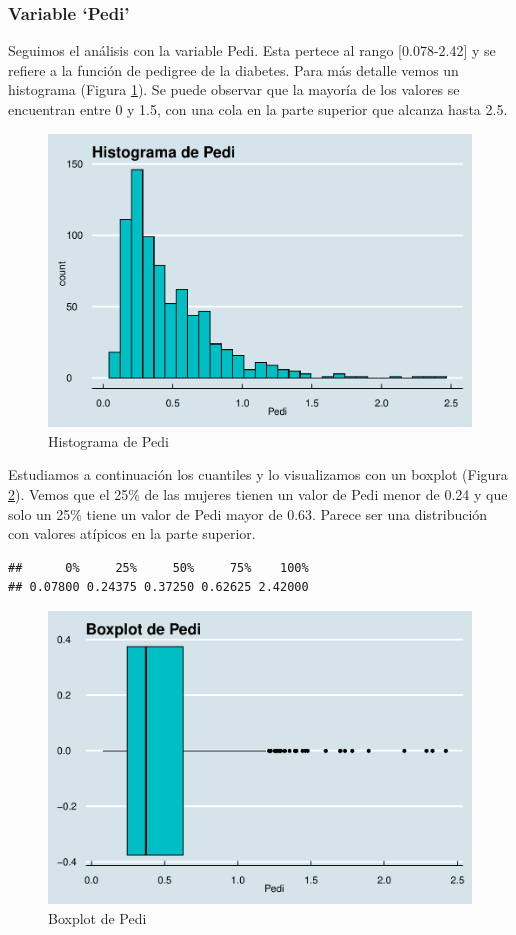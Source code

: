 \documentclass[
]{article}
\begin{document}
\hypertarget{variable-pedi}{%
\subsubsection{Variable `Pedi'}\label{variable-pedi}}

Seguimos el análisis con la variable Pedi. Esta pertece al rango
{[}0.078-2.42{]} y se refiere a la función de pedigree de la diabetes.
Para más detalle vemos un histograma (Figura \ref{fig:hist_pedi}). Se
puede observar que la mayoría de los valores se encuentran entre 0 y
1.5, con una cola en la parte superior que alcanza hasta 2.5.

\begin{figure}

{\centering \includegraphics[width=0.5\linewidth]{pima-clasificacion_files/figure-latex/hist_pedi-1} 

}

\caption{Histograma de Pedi}\label{fig:hist_pedi}
\end{figure}

Estudiamos a continuación los cuantiles y lo visualizamos con un boxplot
(Figura \ref{fig:box_pedi}). Vemos que el 25\% de las mujeres tienen un
valor de Pedi menor de 0.24 y que solo un 25\% tiene un valor de Pedi
mayor de 0.63. Parece ser una distribución con valores atípicos en la
parte superior.

\begin{verbatim}
##      0%     25%     50%     75%    100% 
## 0.07800 0.24375 0.37250 0.62625 2.42000
\end{verbatim}

\begin{figure}

{\centering \includegraphics[width=0.5\linewidth]{pima-clasificacion_files/figure-latex/box_pedi-1} 

}

\caption{Boxplot de Pedi}\label{fig:box_pedi}
\end{figure}
\end{document}
